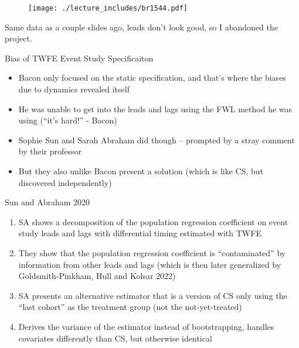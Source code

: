 \documentclass{beamer}
\begin{document}
\begin{frame}[plain]
	\begin{figure}
	\texttt{[image: ./lecture\_includes/br1544.pdf]}
	\end{figure}
	
Same data as a couple slides ago, leads don't look good, so I abandoned the project. 
	
\end{frame}

\begin{frame}{Bias of TWFE Event Study Specificaiton}

\begin{itemize}
\item Bacon only focused on the static specification, and that's where the biases due to dynamics revealed itself
\item He was unable to get into the leads and lags using the FWL method he was using (``it's hard!'' - Bacon)
\item Sophie Sun and Sarah Abraham did though -- prompted by a stray comment by their professor
\item But they also unlike Bacon present a solution (which is like CS, but discovered independently)
\end{itemize}

\end{frame}



\begin{frame}{Sun and Abraham 2020}

	\begin{enumerate}
	\item SA shows a decomposition of the population regression coefficient on event study leads and lags with differential timing estimated with TWFE
	\item They show that the population regression coefficient is ``contaminated'' by information from other leads and lags (which is then later generalized by Goldsmith-Pinkham, Hull and Kolsar 2022)
	\item SA presents an alternative estimator that is a version of CS only using the ``last cohort'' as the treatment group (not the not-yet-treated)
	\item Derives the variance of the estimator instead of bootstrapping, handles covariates differently than CS, but otherwise identical
	\end{enumerate}

\end{frame}
\end{document}

